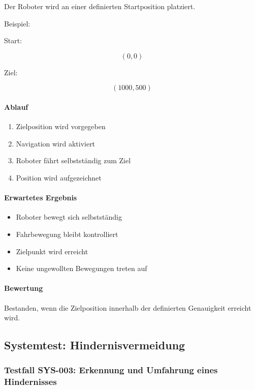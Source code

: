 Der Roboter wird an einer definierten Startposition platziert.

Beispiel:

Start:

\[
(0,0)
\]

Ziel:

\[
(1000,500)
\]

\paragraph{Ablauf}\label{ablauf-25}

\begin{enumerate}
\def\labelenumi{\arabic{enumi}.}
\tightlist
\item
  Zielposition wird vorgegeben
\item
  Navigation wird aktiviert
\item
  Roboter fährt selbstständig zum Ziel
\item
  Position wird aufgezeichnet
\end{enumerate}

\paragraph{Erwartetes Ergebnis}\label{erwartetes-ergebnis-25}

\begin{itemize}
\tightlist
\item
  Roboter bewegt sich selbstständig
\item
  Fahrbewegung bleibt kontrolliert
\item
  Zielpunkt wird erreicht
\item
  Keine ungewollten Bewegungen treten auf
\end{itemize}

\paragraph{Bewertung}\label{bewertung-25}

Bestanden, wenn die Zielposition innerhalb der definierten Genauigkeit
erreicht wird.

\subsection{Systemtest:
Hindernisvermeidung}\label{systemtest-hindernisvermeidung}

\subsubsection{Testfall SYS-003: Erkennung und Umfahrung eines
Hindernisses}\label{testfall-sys-003-erkennung-und-umfahrung-eines-hindernisses}

